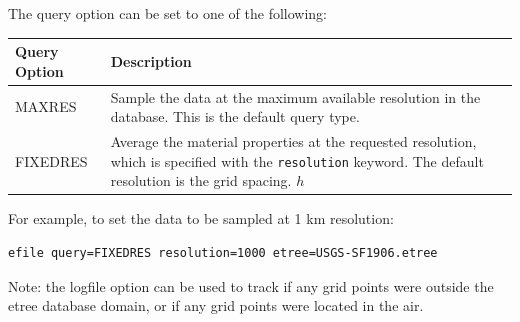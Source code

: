 \documentclass[11pt]{report}
\begin{document}
%
The query option can be set to one of the following:
%
\begin{center}
\begin{tabular}{lp{12cm}} \hline
\bf{Query Option} & \bf{Description} 
\\ \hline 
MAXRES & Sample the data at the maximum available
resolution in the database. This is the default query type. 
\\ 
FIXEDRES & Average the material properties at the requested resolution, which is specified with the
\verb+resolution+ keyword. The default resolution is the grid spacing. $h$ \\
\end{tabular}
\end{center}
%
For example, to set the data to be sampled at 1 km resolution:
\begin{verbatim}
efile query=FIXEDRES resolution=1000 etree=USGS-SF1906.etree
\end{verbatim}
Note: the logfile option can be used to track if any grid points were outside the etree database
domain, or if any grid points were located in the air.

%
\end{document}
